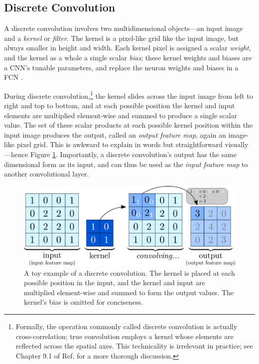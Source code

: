 \documentclass[11pt, a4paper]{article}
\begin{document}
\subsection{Discrete Convolution} \label{ss:discrete-conv}

A discrete convolution involves two multidimensional objects---an input image and a \textit{kernel} or \textit{filter}.
The kernel is a pixel-like grid like the input image, but always smaller in height and width.
Each kernel pixel is assigned a scalar \textit{weight}, and the kernel as a whole a single scalar \textit{bias}; these kernel weights and biases are a CNN's tunable parameters, and replace the neuron weights and biases in a FCN \cite{homl, goodfellow}.

During discrete convolution,\footnote{Formally, the operation commonly called discrete convolution is actually cross-correlation; true convolution employs a kernel whose elements are reflected across the spatial axes.
This technicality is irrelevant in practice; see Chapter 9.1 of Ref. \cite{goodfellow} for a more thorough discussion.} the kernel slides across the input image from left to right and top to bottom, and at each possible position the kernel and input elements are multiplied element-wise and summed to produce a single scalar value.
The set of these scalar products at each possible kernel position within the input image produces the output, called an \textit{output feature map}, again an image-like pixel grid.
This is awkward to explain in words but straightforward visually---hence Figure \ref{fig:conv-single-channel}.
Importantly, a discrete convolution's output has the same dimensional form as its input, and can thus be used as the \textit{input feature map} to another convolutional layer.

\begin{figure}[htb!]
    \centering
    \includegraphics[width=0.8\linewidth]{vector/conv-single-channel.pdf}
    \vspace{-2mm}
    \caption{A toy example of a discrete convolution.
    The kernel is placed at each possible position in the input, and the kernel and input are multiplied element-wise and summed to form the output values.
    The kernel's bias is omitted for conciseness.}
    \label{fig:conv-single-channel}
\end{figure}
\end{document}
